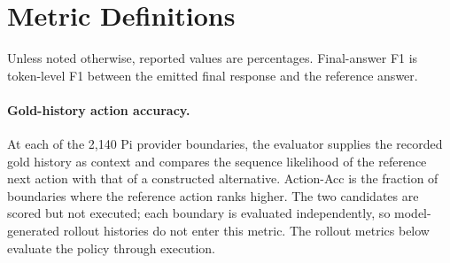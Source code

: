 \documentclass{article}
\begin{document}
\begin{table}[!htbp]
\centering
\small
\caption{Qwen3 model-size results. Action-Acc uses the native gold-history
boundary protocol separately from end-to-end evaluation. Exact retains the historical
strict trajectory-success definition, not answer-string exact match.
All values are percentages.}
\label{tab:model-size}
\end{table}
\FloatBarrier
\section{Metric Definitions}
\label{app:metrics}

Unless noted otherwise, reported values are percentages. Final-answer F1 is
token-level F1 between the emitted final response and the reference answer.

\paragraph{Gold-history action accuracy.}
At each of the 2,140 Pi provider boundaries, the evaluator supplies the
recorded gold history as context and compares the sequence likelihood of the
reference next action with that of a constructed alternative. Action-Acc is the
fraction of boundaries where the reference action ranks higher. The two
candidates are scored but not executed; each boundary is evaluated
independently, so model-generated rollout histories do not enter this metric.
The rollout metrics below evaluate the policy through execution.
\end{document}
